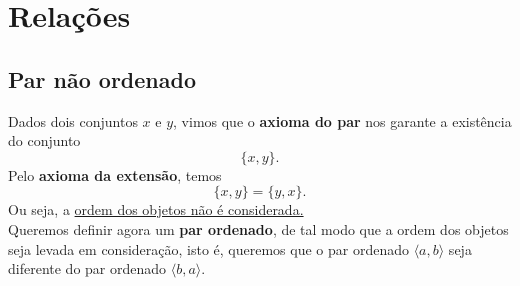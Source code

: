 \section{Relações}
\subsection{Par não ordenado}
Dados dois conjuntos $x$ e $y$, vimos que o \textbf{axioma do par} nos garante a existência do conjunto
$$\{x, y\}.$$
Pelo \textbf{axioma da extensão}, temos
$$\{x,y\} = \{y,x\}.$$
Ou seja, a \underline{ordem dos objetos não é considerada.}\\
Queremos definir agora um \textbf{par ordenado}, de tal modo que a ordem dos objetos seja levada em consideração, isto é, queremos que o par ordenado $\langle a ,b\rangle$ seja diferente do par ordenado $\langle b ,a\rangle$.
